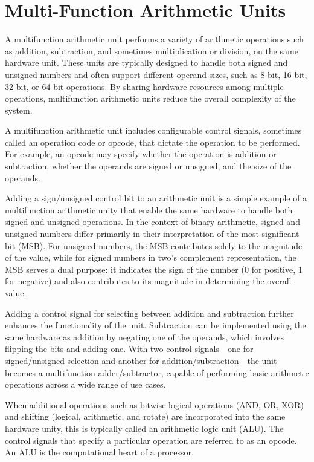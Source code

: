 \section{Multi-Function Arithmetic Units}

A multifunction arithmetic unit performs a variety of arithmetic operations such as addition, subtraction, and sometimes multiplication or division, on the same hardware unit. These units are typically designed to handle both signed and unsigned numbers and often support different operand sizes, such as 8-bit, 16-bit, 32-bit, or 64-bit operations. By sharing hardware resources among multiple operations, multifunction arithmetic units reduce the overall complexity of the system.

A multifunction arithmetic unit includes configurable control signals, sometimes called an operation code or opcode, that dictate the operation to be performed. For example, an opcode may specify whether the operation is addition or subtraction, whether the operands are signed or unsigned, and the size of the operands. 

 Adding a sign/unsigned control bit to an arithmetic unit is a simple example of a multifunction arithmetic unity that enable the same hardware to handle both signed and unsigned operations. In the context of binary arithmetic, signed and unsigned numbers differ primarily in their interpretation of the most significant bit (MSB). For unsigned numbers, the MSB contributes solely to the magnitude of the value, while for signed numbers in two's complement representation, the MSB serves a dual purpose: it indicates the sign of the number (0 for positive, 1 for negative) and also contributes to its magnitude in determining the overall value. 
 
 Adding a control signal for selecting between addition and subtraction further enhances the functionality of the unit. Subtraction can be implemented using the same hardware as addition by negating one of the operands, which involves flipping the bits and adding one. With two control signals—one for signed/unsigned selection and another for addition/subtraction—the unit becomes a multifunction adder/subtractor, capable of performing basic arithmetic operations across a wide range of use cases.

When additional operations such as bitwise logical operations (AND, OR, XOR) and shifting (logical, arithmetic, and rotate) are incorporated into the same hardware unity, this is typically called an arithmetic logic unit (ALU). The control signals that specify a particular operation are referred to as an opcode. An ALU is the computational heart of a processor.

